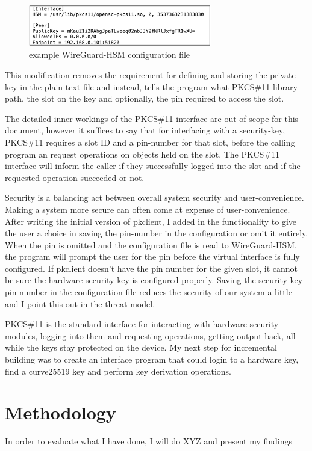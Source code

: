 \documentclass [11pt, proquest] {uwthesis}[2020/02/24]
\begin{document}
\begin{figure}[ht]
\includegraphics[width=8cm]{paper/images/wg_conf_hsm.png}
\caption{example WireGuard-HSM configuration file}
\label{fig:hsm_config}
\end{figure}
This modification removes the requirement for defining and storing the private-key in the plain-text file and instead, tells the program what PKCS\#11 library path, the slot on the key and optionally, the pin required to access the slot.

The detailed inner-workings of the PKCS\#11 interface are out of scope for this document, however it suffices to say that for interfacing with a security-key, PKCS\#11 requires a slot ID and a pin-number for that slot, before the calling program an request operations on objects held on the slot. The PKCS\#11 interface will inform the caller if they successfully logged into the slot and if the requested operation succeeded or not.

Security is a balancing act between overall system security and user-convenience. Making a system more secure can often come at expense of user-convenience. After writing the initial version of pkclient, I added in the functionality to give the user a choice in saving the pin-number in the configuration or omit it entirely. When the pin is omitted and the configuration file is read to WireGuard-HSM, the program will prompt the user for the pin before the virtual interface is fully configured. If pkclient doesn't have the pin number for the given slot, it cannot be sure the hardware security key is configured properly. Saving the security-key pin-number in the configuration file reduces the security of our system a little and I point this out in the threat model. 


PKCS\#11 is the standard interface for interacting with hardware security modules, logging into them and requesting operations, getting output back, all while the keys stay protected on the device.
My next step for incremental building was to create an interface program that could login to a hardware key, find a curve25519 key and perform key derivation operations.



\section {Methodology}
In order to evaluate what I have done, I will do XYZ and present my findings
\end{document}
